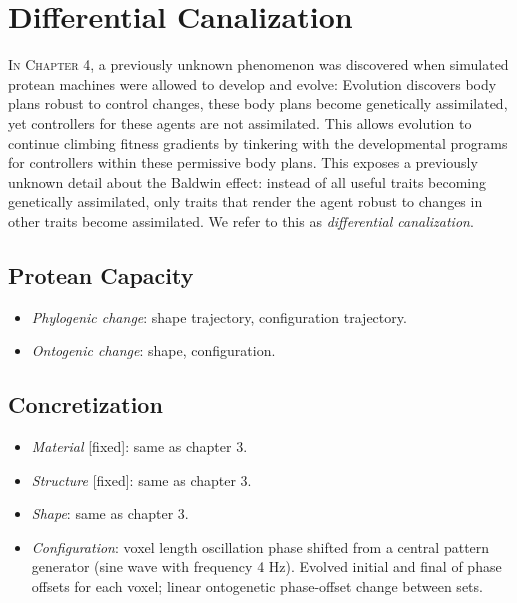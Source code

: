 

\section{Differential Canalization}

\textsc{In Chapter 4,}
a previously unknown phenomenon was discovered when simulated protean machines were allowed to develop and evolve: 
Evolution discovers body plans robust to control changes, these body plans become genetically assimilated, yet controllers for these agents are not assimilated. 
This allows evolution to continue climbing fitness gradients by tinkering with the developmental programs for controllers within these permissive body plans. 
This exposes a previously unknown detail about the Baldwin effect: instead of all useful traits becoming genetically assimilated, only traits that render the agent robust to changes in other traits become assimilated. 
We refer to this as \textit{differential canalization}.


\subsection{Protean Capacity}

\begin{itemize}
    \item \textit{Phylogenic change}: shape trajectory, configuration trajectory.
    \item \textit{Ontogenic change}: shape, configuration.
\end{itemize}


\subsection{Concretization}

\begin{itemize}
    \item \textit{Material} [fixed]: same as chapter 3.
    \item \textit{Structure} [fixed]: same as chapter 3.
    \item \textit{Shape}: same as chapter 3.
    \item \textit{Configuration}: voxel length oscillation phase shifted from a central pattern generator (sine wave with frequency 4 Hz).
    Evolved initial and final of phase offsets for each voxel; linear ontogenetic phase-offset change between sets.
\end{itemize}




